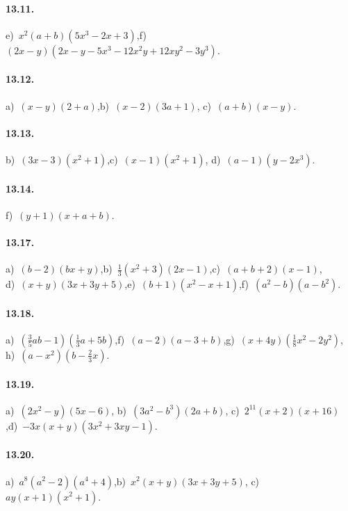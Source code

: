 \paragraph{13.11.}
e)~$x^{2}(a+b)(5x^{3}-2x+3)$,\quad f)~$(2x-y)\left(2x-y-5x^3-12x^2y+12xy^2-3y^3\right)$.

\paragraph{13.12.}
a)~$(x-y)(2+a)$,\quad b)~$(x-2)(3a+1)$, \quad c)~$(a+b)(x-y)$.

\paragraph{13.13.}
b)~$(3x-3)\left(x^2+1\right)$,\quad c)~$(x-1)\left(x^{2}+1\right)$, \quad d)~$(a-1)\left(y-2x^{3}\right)$.

\paragraph{13.14.}
f)~$(y+1)(x+a+b)$.

\paragraph{13.17.}
a)~$(b-2)(bx+y)$,\quad b)~$\frac{1}{3}\left(x^{2}+3\right)(2x-1)$,\quad c)~$(a+b+2)(x-1)$,\protect\\ d)~$(x+y)(3x+3y+5)$,\quad e)~$(b+1)(x^{2}-x+1)$,\quad f)~$\left(a^{2}-b\right)\left(a-b^{2}\right)$.

\paragraph{13.18.}
a)~$\left(\frac{3}{5}ab-1\right)\left(\frac{1}{3}a+5b\right)$,\quad f)~$(a-2)(a-3+b)$,\quad g)~$(x+4y)\left(\frac{1}{8}x^2-2y^2\right)$,\protect\\ h)~$\left(a-x^2\right)\left(b-\frac{2}{3}x\right)$.

\paragraph{13.19.}
a)~$\left(2x^2-y\right)(5x-6)$, \quad b)~$(3a^2-b^3)(2a+b)$, \quad c)~$2^{11}(x+2)(x+16)$,\quad d)~$-3x(x+y)\left(3x^2+3xy-1\right)$.

\paragraph{13.20.}
a)~$a^{8}\left(a^{2}-2\right)\left(a^{4}+4\right)$,\quad b)~$x^{2}(x+y)(3x+3y+5)$, \quad c)~$ay(x+1)(x^{2}+1)$.


